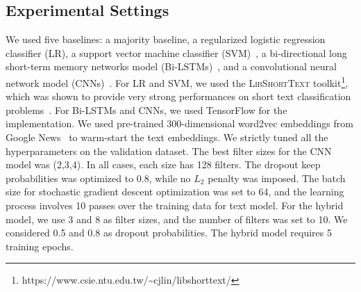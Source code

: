 \documentclass[11pt,a4paper]{article}
\begin{document}
\subsection{Experimental Settings}
We used five baselines: a majority baseline, a regularized logistic regression classifier (LR), a support vector machine classifier (SVM)~\cite{crammer2001algorithmic}, a bi-directional long short-term memory networks model (Bi-LSTMs)~\cite{hochreiter1997long,graves2005framewise}, and a convolutional neural network model (CNNs)~\cite{kim:2014:EMNLP2014}. For LR and SVM, we used the \textsc{LibShortText} toolkit\footnote{https://www.csie.ntu.edu.tw/\~{}cjlin/libshorttext/}, which was shown to provide very strong performances on short text classification problems~\cite{Wang:2015:EMNLP}. For Bi-LSTMs and CNNs, we used TensorFlow for the implementation. We used pre-trained 300-dimensional word2vec embeddings from Google News~\cite{mikolov2013efficient} to warm-start the text embeddings. We strictly tuned all the hyperparameters on the validation dataset. The best filter sizes for the CNN model was (2,3,4). In all cases, each size has 128 filters. The dropout keep probabilities was optimized to 0.8, while no $L_2$ penalty was imposed. The batch size for stochastic gradient descent optimization was set to 64, and the learning process involves 10 passes over the training data for text model. For the hybrid model, we use 3 and 8 as filter sizes, and the number of filters was set to 10. We considered 0.5 and 0.8 as dropout probabilities. The hybrid model requires 5 training epochs. 
\end{document}
